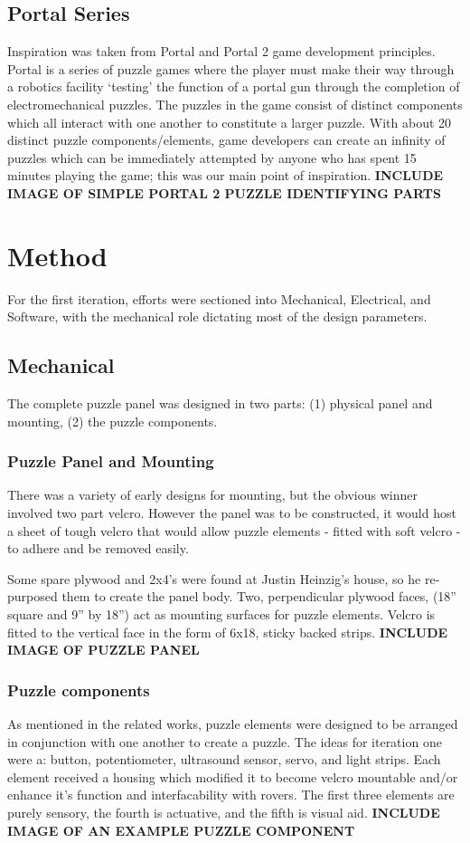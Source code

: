 \documentclass[conference]{IEEEtran}
\begin{document}
	\subsection{Portal Series}
	Inspiration was taken from Portal and Portal 2 game development principles. Portal is a series of puzzle games where the player must make their way through a robotics facility `testing' the function of a portal gun through the completion of electromechanical puzzles. The puzzles in the game consist of distinct components which all interact with one another to constitute a larger puzzle. With about 20 distinct puzzle components/elements, game developers can create an infinity of puzzles which can be immediately attempted by anyone who has spent 15 minutes playing the game; this was our main point of inspiration.
	\textbf{INCLUDE IMAGE OF SIMPLE PORTAL 2 PUZZLE IDENTIFYING PARTS}


\section{Method}
	For the first iteration, efforts were sectioned into Mechanical, Electrical, and Software, with the mechanical role dictating most of the design parameters.

	\subsection{Mechanical}
	The complete puzzle panel was designed in two parts: (1) physical panel and mounting, (2) the puzzle components.  

		\subsubsection{Puzzle Panel and Mounting}
		There was a variety of early designs for mounting, but the obvious winner involved two part velcro. However the panel was to be constructed, it would host a sheet of tough velcro that would allow puzzle elements - fitted with soft velcro - to adhere and be removed easily.
		
		Some spare plywood and 2x4's  were found at Justin Heinzig's house, so he re-purposed them to create the panel body. Two, perpendicular plywood faces, (18'' square and 9'' by 18'') act as mounting surfaces for puzzle elements. Velcro is fitted to the vertical face in the form of 6x18, sticky backed strips.
		\textbf{INCLUDE IMAGE OF PUZZLE PANEL}
		
		\subsubsection{Puzzle components}
		As mentioned in the related works, puzzle elements were designed to be arranged in conjunction with one another to create a puzzle. The ideas for iteration one were a: button, potentiometer, ultrasound sensor, servo, and light strips. Each element received a housing which modified it to become velcro mountable and/or enhance it's function and interfacability with rovers. The first three elements are purely sensory, the fourth is actuative, and the fifth is visual aid.
		\textbf{INCLUDE IMAGE OF AN EXAMPLE PUZZLE COMPONENT}
\end{document}
